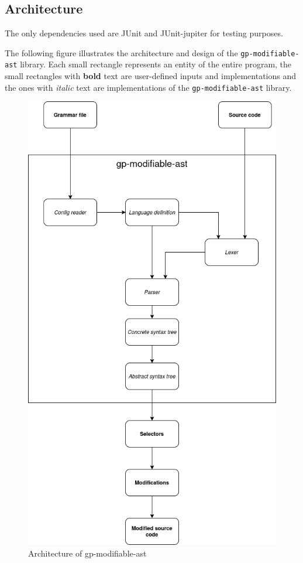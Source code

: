 \subsection{Architecture}

The only dependencies used are JUnit and JUnit-jupiter \cite{junit} for testing purposes.

The following figure illustrates the architecture and design of the \verb|gp-modifiable-ast| library.
Each small rectangle represents an entity of the entire program, the small rectangles with \textbf{bold} text are user-defined inputs and implementations and
the ones with \textit{italic} text are implementations of the \verb|gp-modifiable-ast| library.


\begin{figure}[H]
    \centering
    \includegraphics[scale=0.40]{fig/architecture.png}
    \caption{Architecture of gp-modifiable-ast}
\end{figure}

